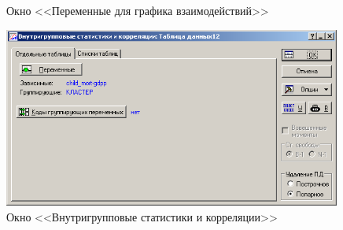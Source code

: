 \begin{figure}[!h]
\begin{minipage}{0.49\textwidth}
    \caption{Окно <<Переменные для графика взаимодействий>>}
    \label{fig:var5__3_17}
  \end{minipage}
\end{figure}

\begin{figure}[!h]
  \centering

  \includegraphics[width=0.99\textwidth]
  {inc/cars_my/var5__3_18.PNG}

  \caption{Окно <<Внутригрупповые статистики и корреляции>>}
  \label{fig:var5__3_18}
\end{figure}


